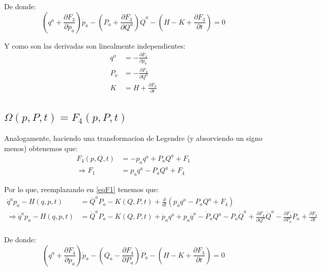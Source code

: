 \documentclass[12pt]{report}
\begin{document}
De donde:
	\begin{equation*}
		\left(q^{a} + \frac{\partial F_{3}}{\partial p_{a}} \right)\dot{p}_{a}
	   -\left( P_{a} +\frac{\partial F_{3}}{\partial Q^{a}} \right)\dot{Q}^{a}
	   - \left(H - K + \frac{\partial F_{3}}{\partial t}\right)  = 0
	\end{equation*}

Y como son las derivadas son linealmente independientes:
	\begin{align*}
		q^{a} &= -\frac{\partial F_{3}}{\partial p_{a}}\\
		P_{a} &= -\frac{\partial F_{3}}{\partial Q^{a}} \\
		K &= H + \frac{\partial F_{3}}{\partial t}
	\end{align*}

\subsection{$\Omega(p,P,t) = F_{4}(p,P,t)$}

Analogamente, haciendo una transformacion de Legendre (y absorviendo un signo menos) obtenemos que:
	\begin{align*}
		F_{4}(p,Q,t) &= -p_{a}q^{a}+P_{a}Q^{a} + F_{1} \\
		\Rightarrow F_{1} &= p_{a}q^{a} - P_{a}Q^{a} + F_{4}
	\end{align*}
	
Por lo que, reemplazando en \eqref{eqF1} tenemos que:
	\begin{align*}
		\dot{q}^{a}p_{a} - H(q,p,t) &=  \dot{Q}^{a}P_{a} - K(Q,P,t)  + \frac{d}{dt} \left( p_{a}q^{a} - P_{a}Q^{a} + F_{4} \right) \\ \label{eqF1}
\Rightarrow \dot{q}^{a}p_{a} - H(q,p,t) &=  \dot{Q}^{a}P_{a} - K(Q,P,t)  + \dot{p}_{a}q^{a} + p_{a}\dot{q}^{a}
										   - \dot{P}_{a}Q^{a} - P_{a}\dot{Q}^{a}
										   +\frac{\partial F_{4}}{\partial Q^{a}}\dot{Q}^{a} 
										   -\frac{\partial F_{4}}{\partial P_{a}}\dot{P}_{a} + \frac{\partial F_{3}}{\partial t}\\
	\end{align*}
	
De donde:
	\begin{equation*}
		\left(q^{a} + \frac{\partial F_{4}}{\partial p_{a}} \right)\dot{p}_{a}
	   -\left( Q_{a} -\frac{\partial F_{4}}{\partial P_{a}} \right)\dot{P}_{a}
	   - \left(H - K + \frac{\partial F_{3}}{\partial t}\right)  = 0
	\end{equation*}
\end{document}

